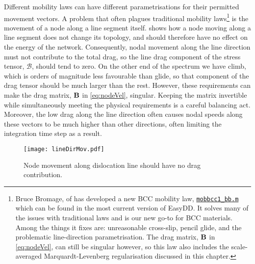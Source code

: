Different mobility laws can have different parametrisations for their permitted movement vectors. A problem that often plagues traditional mobility laws\footnote{Bruce Bromage, of \cite{bromage2018calculating} has developed a new BCC mobility law, \href{https://github.com/TarletonGroup/EasyDD/blob/master/src/mobbcc_bb1b.m}{\texttt{mobbcc1\_bb.m}} which can be found in the most current version of EasyDD. It solves many of the issues with traditional laws and is our new go-to for BCC materials. Among the things it fixes are: unreasonable cross-slip, pencil glide, and the problematic line-direction parametrisation. The drag matrix, $\mathbf{B}$ in \cref{eq:nodeVel}, can still be singular however, so this law also includes the scale-averaged Marquardt-Levenberg regularisation discussed in this chapter.} is the movement of a node along a line segment itself.  shows how a node moving along a line segment does not change its topology, and should therefore have no effect on the energy of the network. Consequently, nodal movement along the line direction must not contribute to the total drag, so the line drag component of the stress tensor, $\mathcal{B}$, should tend to zero. On the other end of the spectrum we have climb, which is orders of magnitude less favourable than glide, so that component of the drag tensor should be much larger than the rest. However, these requirements can make the drag matrix, $\mathbf{B}$ in \cref{eq:nodeVel}, singular. Keeping the matrix invertible while simultaneously meeting the physical requirements is a careful balancing act. Moreover, the low drag along the line direction often causes nodal speeds along these vectors to be much higher than other directions, often limiting the integration time step as a result.
\begin{figure}
    \centering
    \texttt{[image: lineDirMov.pdf]}
    \caption{Node movement along dislocation line should have no drag contribution.}
    \label{f:lineMovement}
\end{figure}

